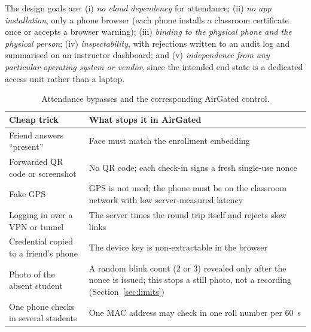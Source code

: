 \documentclass[11pt,a4paper]{article}
\newcommand{\sys}{AirGated}
\begin{document}
The design goals are: (i) \emph{no cloud dependency} for attendance; (ii) \emph{no app installation}, only a phone browser (each phone installs a classroom certificate once or accepts a browser warning); (iii) \emph{binding to the physical phone and the physical person}; (iv) \emph{inspectability}, with rejections written to an audit log and summarised on an instructor dashboard; and (v) \emph{independence from any particular operating system or vendor}, since the intended end state is a dedicated access unit rather than a laptop.

\begin{table}[t]
\centering
\small
\begin{tabular}{@{}p{4.6cm}p{9.6cm}@{}}
\toprule
Cheap trick & What stops it in \sys{} \\
\midrule
Friend answers ``present'' & Face must match the enrollment embedding \\
Forwarded QR code or screenshot & No QR code; each check-in signs a fresh single-use nonce \\
Fake GPS & GPS is not used; the phone must be on the classroom network with low server-measured latency \\
Logging in over a VPN or tunnel & The server times the round trip itself and rejects slow links \\
Credential copied to a friend's phone & The device key is non-extractable in the browser \\
Photo of the absent student & A random blink count (2 or 3) revealed only after the nonce is issued; this stops a still photo, not a recording (Section~\ref{sec:limits}) \\
One phone checks in several students & One MAC address may check in one roll number per 60~s \\
\bottomrule
\end{tabular}
\caption{Attendance bypasses and the corresponding \sys{} control.}
\label{tab:tricks}
\end{table}
\end{document}
